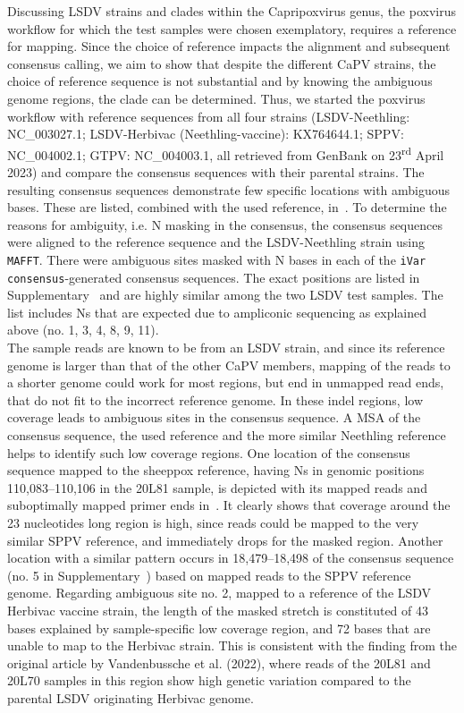 Discussing \ac{LSDV} strains and clades within the Capripoxvirus genus, the poxvirus workflow for which the test samples were chosen exemplatory, requires a reference for mapping. Since the choice of reference impacts the alignment and subsequent consensus calling, we aim to show that despite the different \ac{CaPV} strains, the choice of reference sequence is not substantial and by knowing the ambiguous genome regions, the clade can be determined. Thus, we started the poxvirus workflow with reference sequences from all four strains (\ac{LSDV}-Neethling: NC\_003027.1; \ac{LSDV}-Herbivac (Neethling-vaccine): KX764644.1; SPPV: NC\_004002.1; \ac{GTPV}: NC\_004003.1, all retrieved from GenBank on 23\textsuperscript{rd} April 2023) and compare the consensus sequences with their parental strains. The resulting consensus sequences demonstrate few specific locations with ambiguous bases. These are listed, combined with the used reference, in~. To determine the reasons for ambiguity, i.e. N masking in the consensus, the consensus sequences were aligned to the reference sequence and the \ac{LSDV}-Neethling strain using \texttt{\acs{MAFFT}}. There were ambiguous sites masked with N bases in each of the \texttt{iVar consensus}-generated consensus sequences. The exact positions are listed in Supplementary~ and are highly similar among the two \ac{LSDV} test samples. The list includes Ns that are expected due to ampliconic sequencing as explained above (no. 1, 3, 4, 8, 9, 11).\\
The sample reads are known to be from an \ac{LSDV} strain, and since its reference genome is larger than that of the other \acs{CaPV} members, mapping of the reads to a shorter genome could work for most regions, but end in unmapped read ends, that do not fit to the incorrect reference genome. In these indel regions, low coverage leads to ambiguous sites in the consensus sequence. A \ac{MSA} of the consensus sequence, the used reference and the more similar Neethling reference helps to identify such low coverage regions. One location of the consensus sequence mapped to the sheeppox reference, having Ns in genomic positions 110,083--110,106 in the 20L81 sample, is depicted with its mapped reads and suboptimally mapped primer ends in~. It clearly shows that coverage around the 23 nucleotides long region is high, since reads could be mapped to the very similar \ac{SPPV} reference, and immediately drops for the masked region. Another location with a similar pattern occurs in 18,479--18,498 of the consensus sequence (no. 5 in Supplementary~) based on mapped reads to the \ac{SPPV} reference genome. Regarding ambiguous site no. 2, mapped to a reference of the \ac{LSDV} Herbivac vaccine strain, the length of the masked stretch is constituted of 43 bases explained by sample-specific low coverage region, and 72 bases that are unable to map to the Herbivac strain. This is consistent with the finding from the original article by Vandenbussche et al. (2022), where reads of the 20L81 and 20L70 samples in this region show high genetic variation compared to the parental \ac{LSDV} originating Herbivac genome.\\
